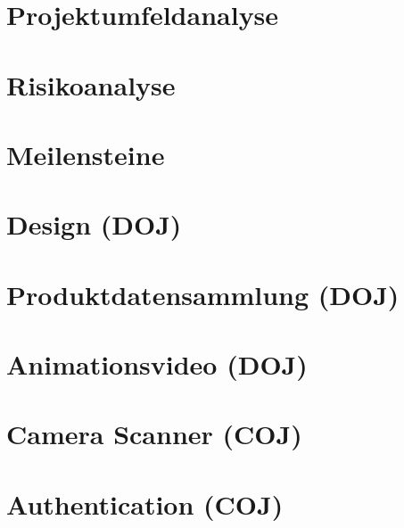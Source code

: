 \documentclass[
    headings=optiontotocandhead,%
    twoside,
    numbers=noenddot,%
    toc=flat, %
    12pt, %
    titlepage, %
    parskip=full, %
    listof=totoc, %
    listof=flat, %
    numbers=noenddot, %
    bibliography=totoc, %
    a4paper,DIV=14,
    BCOR=15mm,
]{scrbook}
\begin{document}
\chapter{Projektumfeldanalyse}
\renewcommand{\kapitelautor}{Autor: Rafael Doja}


\chapter{Risikoanalyse}
\renewcommand{\kapitelautor}{Autor: Rafael Doja}


\chapter{Meilensteine}
\renewcommand{\kapitelautor}{Autor: Rafael Doja}



\chapter{Design (DOJ)}
\renewcommand{\kapitelautor}{Autor: Rafael Doja}


\chapter{Produktdatensammlung (DOJ)}
\renewcommand{\kapitelautor}{Autor: Rafael Doja}

\chapter{Animationsvideo (DOJ)}
\renewcommand{\kapitelautor}{Autor: Rafael Doja}


\chapter{Camera Scanner (COJ)}
\renewcommand{\kapitelautor}{Autor: Filip Coja}


\chapter{Authentication (COJ)}
\renewcommand{\kapitelautor}{Autor: Filip Coja}

\end{document}
